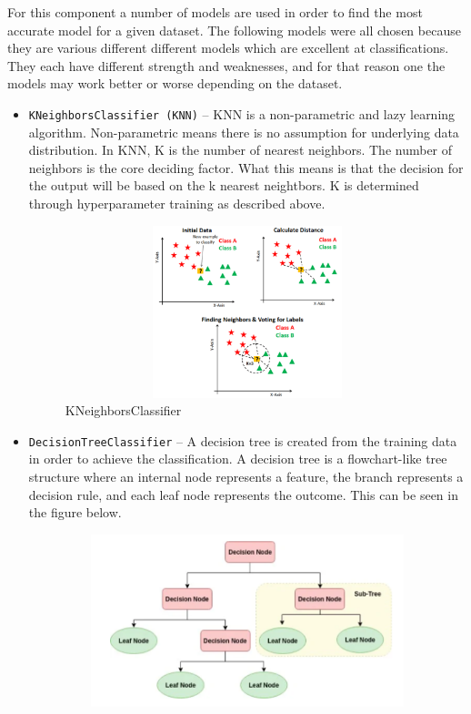 For this component a number of models are used in order to find the most accurate model for a given dataset. The following models were all chosen because they are various different different models which are excellent at classifications. They each have different strength and weaknesses, and for that reason one the models may work better or worse depending on the dataset.
\begin{itemize}
    \item \texttt{KNeighborsClassifier (KNN)} -- KNN is a non-parametric and lazy learning algorithm. Non-parametric means there is no assumption for underlying data distribution. In KNN, K is the number of nearest neighbors. The number of neighbors is the core deciding factor. What this means is that the decision for the output will be based on the k nearest neightbors. K is determined through hyperparameter training as described above.
    \begin{figure}[h]
        \centering
        \includegraphics[width=15cm,height=5cm,keepaspectratio]{implementation/kNN.png}
        \caption{KNeighborsClassifier}
        \label{fig:kNN}
    \end{figure}
    \item \texttt{DecisionTreeClassifier} -- A decision tree is created from the training data in order to achieve the classification. A decision tree is a flowchart-like tree structure where an internal node represents a feature, the branch represents a decision rule, and each leaf node represents the outcome. This can be seen in the figure below.
    \begin{figure}[h]
        \centering
        \includegraphics[width=15cm,height=5cm,keepaspectratio]{implementation/decisionTree.png}

\end{figure}
\end{itemize}
